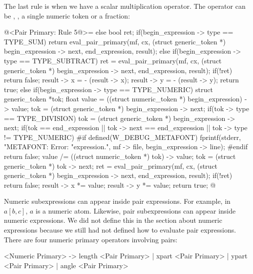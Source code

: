 The last rule is when we have a scalar multiplication operator. The
operator can be \monoespaco{+}, \monoespaco{-}, a single numeric token
or a fraction:

\iniciocodigo
@<Pair Primary: Rule 5@>=
else{
  bool ret;
  if(begin_expression -> type == TYPE_SUM)
    return eval_pair_primary(mf, cx, (struct generic_token *)
                                     begin_expression -> next,
                             end_expression, result);
  else if(begin_expression -> type == TYPE_SUBTRACT){
    ret = eval_pair_primary(mf, cx, (struct generic_token *)
                                     begin_expression -> next,
                             end_expression, result);
    if(!ret)
      return false;
    result -> x = - (result -> x);
    result -> y = - (result -> y);
    return true;
  }
  else if(begin_expression -> type == TYPE_NUMERIC){
    struct generic_token *tok;
    float value = ((struct numeric_token *) begin_expression) -> value;
    tok = (struct generic_token *) begin_expression -> next;
    if(tok -> type == TYPE_DIVISION){
      tok = (struct generic_token *) begin_expression -> next;
      if(tok == end_expression || tok -> next == end_expression ||
         tok -> type != TYPE_NUMERIC){
#if defined(W_DEBUG_METAFONT)
        fprintf(stderr, "METAFONT: Error: %
                "expression.\n ", mf -> file, begin_expression -> line);
#endif
        return false;
      }
      value /= ((struct numeric_token *) tok) -> value;
      tok = (struct generic_token *) tok -> next;
    }
    ret = eval_pair_primary(mf, cx, (struct generic_token *)
                                     begin_expression -> next,
                             end_expression, result);
    if(!ret)
      return false;
    result -> x *= value;
    result -> y *= value;
    return true;
  }
}
@
\fimcodigo


Numeric subexpressions can appear inside pair expressions. For
example, in $a[b,c]$, $a$ is a numeric atom. Likewise, pair
subexpressions can appear inside numeric expressions. We did not
define this in the section about numeric expressions because we still
had not defined how to evaluate pair expressions. There are four
numeric primary operators involving pairs:

\alinhaverbatim
<Numeric Primary> -> length <Pair Primary> | xpart <Pair Primary> |
                       ypart <Pair Primary> | angle <Pair Primary>
\alinhanormal

